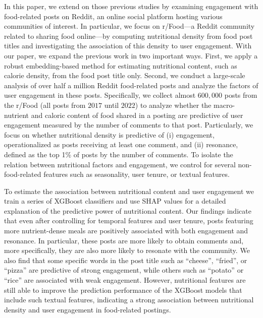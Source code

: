 In this paper, we extend on those previous studies by examining engagement with food-related posts on Reddit, an online social platform hosting various communities of interest.
In particular, we focus on r/Food---a Reddit community related to sharing food online---by computing nutritional density from food post titles and investigating the association of this density to user engagement. 
With our paper, we expand the previous work in two important ways. 
First, we apply a robust embedding-based method for estimating nutritional content, such as calorie density, from the food post title only. 
Second, we conduct a large-scale analysis of over half a million Reddit food-related posts and analyze the factors of user engagement in these posts.
Specifically, we collect almost $600,000$ posts from the r/Food (all posts from $2017$ until $2022$) to analyze whether the macro-nutrient and caloric content of food shared in a posting are predictive of user engagement measured by the number of comments to that post.
Particularly, we focus on whether nutritional density is predictive of (i) engagement, operationalized as posts receiving at least one comment, and (ii) resonance, defined as the top 1\% of posts by the number of comments.
To isolate the relation between nutritional factors and engagement, we control for several non-food-related features such as seasonality, user tenure, or textual features. 

To estimate the association between nutritional content and user engagement we train a series of XGBoost classifiers \cite{chen_xgboost_2016} and use SHAP values \cite{lundberg_unified_2017} for a detailed explanation of the predictive power of nutritional content. Our findings indicate that even after controlling for temporal features and user tenure, posts featuring more nutrient-dense meals are positively associated with both engagement and resonance. In particular, these posts are more likely to obtain comments and, more specifically, they are also more likely to resonate with the community. We also find that some specific words in the post title such as ``cheese'', ``fried'', or ``pizza'' are predictive of strong engagement, while others such as ``potato'' or ``rice'' are associated with weak engagement. However, nutritional features are still able to improve the prediction performance of the XGBoost models that include such textual features, indicating a strong association between nutritional density and user engagement in food-related postings.

